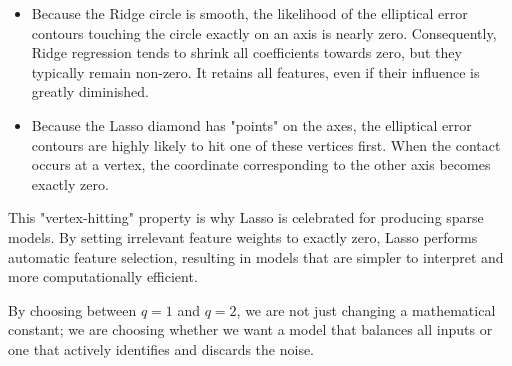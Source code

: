 \begin{itemize}
    \item Because the Ridge circle is smooth, the likelihood of the elliptical error contours touching the circle exactly on an axis is nearly zero. Consequently, Ridge regression tends to shrink all coefficients towards zero, but they typically remain non-zero. It retains all features, even if their influence is greatly diminished.
    
    \item Because the Lasso diamond has "points" on the axes, the elliptical error contours are highly likely to hit one of these vertices first. When the contact occurs at a vertex, the coordinate corresponding to the other axis becomes exactly zero.
\end{itemize}

This "vertex-hitting" property is why Lasso is celebrated for producing sparse models. By setting irrelevant feature weights to exactly zero, Lasso performs automatic feature selection, resulting in models that are simpler to interpret and more computationally efficient.

By choosing between $q=1$ and $q=2$, we are not just changing a mathematical constant; we are choosing whether we want a model that balances all inputs or one that actively identifies and discards the noise.


